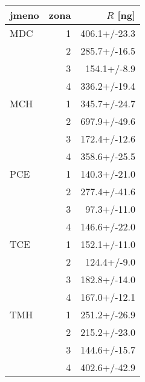 \begin{tabular}{lrr}
\toprule
jmeno & zona & $R$ [ng]     \\
\midrule
MDC & 1 &  406.1+/-23.3 \\
    & 2 &  285.7+/-16.5 \\
    & 3 &   154.1+/-8.9 \\
    & 4 &  336.2+/-19.4 \\
MCH & 1 &  345.7+/-24.7 \\
    & 2 &  697.9+/-49.6 \\
    & 3 &  172.4+/-12.6 \\
    & 4 &  358.6+/-25.5 \\
PCE & 1 &  140.3+/-21.0 \\
    & 2 &  277.4+/-41.6 \\
    & 3 &   97.3+/-11.0 \\
    & 4 &  146.6+/-22.0 \\
TCE & 1 &  152.1+/-11.0 \\
    & 2 &   124.4+/-9.0 \\
    & 3 &  182.8+/-14.0 \\
    & 4 &  167.0+/-12.1 \\
TMH & 1 &  251.2+/-26.9 \\
    & 2 &  215.2+/-23.0 \\
    & 3 &  144.6+/-15.7 \\
    & 4 &  402.6+/-42.9 \\
\bottomrule
\end{tabular}
